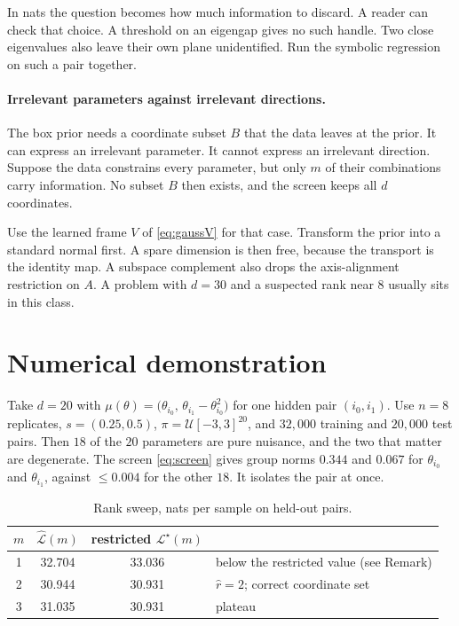 \documentclass[11pt, letterpaper]{article}
\theoremstyle{definition}
\begin{document}
In nats the question becomes how much information to discard. A reader can check
that choice. A threshold on an eigengap gives no such handle. Two close
eigenvalues also leave their own plane unidentified. Run the symbolic regression
on such a pair together.

\paragraph{Irrelevant parameters against irrelevant directions.}
The box prior needs a coordinate subset $B$ that the data leaves at the prior.
It can express an irrelevant parameter. It cannot express an irrelevant
direction. Suppose the data constrains every parameter, but only $m$ of their
combinations carry information. No subset $B$ then exists, and the screen keeps
all $d$ coordinates.

Use the learned frame $V$ of \eqref{eq:gaussV} for that case. Transform the
prior into a standard normal first. A spare dimension is then free, because the
transport is the identity map. A subspace complement also drops the
axis-alignment restriction on $A$. A problem with $d=30$ and a suspected rank
near $8$ usually sits in this class.

\section*{Numerical demonstration}

Take $d=20$ with
$\mu(\theta)=\bigl(\theta_{i_0},\,\theta_{i_1}-\theta_{i_0}^2\bigr)$ for one
hidden pair $(i_0,i_1)$. Use $n=8$ replicates, $s=(0.25,0.5)$,
$\pi=\mathcal{U}[-3,3]^{20}$, and $32{,}000$ training and $20{,}000$ test pairs.
Then $18$ of the $20$ parameters are pure nuisance, and the two that matter are
degenerate. The screen \eqref{eq:screen} gives group norms $0.344$ and $0.067$
for $\theta_{i_0}$ and $\theta_{i_1}$, against $\le0.004$ for the other $18$.
It isolates the pair at once.

\begin{table}[h]
\centering
\begin{tabular}{cccl}
\toprule
$m$ & $\hat{\mathcal{L}}(m)$ & restricted $\mathcal{L}^\star(m)$ & \\
\midrule
1 & 32.704 & 33.036 & below the restricted value (see Remark) \\
2 & 30.944 & 30.931 & $\hat r=2$; correct coordinate set \\
3 & 31.035 & 30.931 & plateau \\
\bottomrule
\end{tabular}
\caption{Rank sweep, nats per sample on held-out pairs.}
\end{table}
\end{document}
